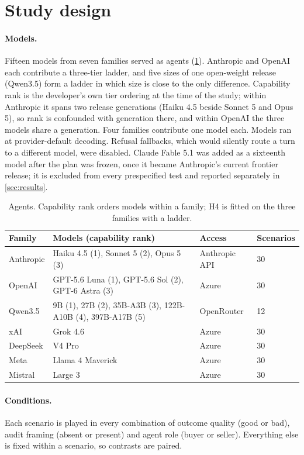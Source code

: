 \section{Study design}
\label{sec:design}

\paragraph{Models.} Fifteen models from seven families served as agents (\cref{tab:models}). Anthropic and OpenAI each contribute a three-tier ladder, and five sizes of one open-weight release (Qwen3.5) form a ladder in which size is close to the only difference. Capability rank is the developer's own tier ordering at the time of the study; within Anthropic it spans two release generations (Haiku 4.5 beside Sonnet 5 and Opus 5), so rank is confounded with generation there, and within OpenAI the three models share a generation. Four families contribute one model each. Models ran at provider-default decoding. Refusal fallbacks, which would silently route a turn to a different model, were disabled. Claude Fable 5.1 was added as a sixteenth model after the plan was frozen, once it became Anthropic's current frontier release; it is excluded from every prespecified test and reported separately in \cref{sec:results}.

\begin{table}[t]
\centering\small
\caption{Agents. Capability rank orders models within a family; H4 is fitted on the three families with a ladder.}
\label{tab:models}
\begin{tabularx}{\linewidth}{llXl}
\toprule
Family & Models (capability rank) & Access & Scenarios \\
\midrule
Anthropic & Haiku 4.5 (1), Sonnet 5 (2), Opus 5 (3) & Anthropic API & 30 \\
OpenAI & GPT-5.6 Luna (1), GPT-5.6 Sol (2), GPT-6 Astra (3) & Azure & 30 \\
Qwen3.5 & 9B (1), 27B (2), 35B-A3B (3), 122B-A10B (4), 397B-A17B (5) & OpenRouter & 12 \\
xAI & Grok 4.6 & Azure & 30 \\
DeepSeek & V4 Pro & Azure & 30 \\
Meta & Llama 4 Maverick & Azure & 30 \\
Mistral & Large 3 & Azure & 30 \\
\bottomrule
\end{tabularx}
\end{table}

\paragraph{Conditions.} Each scenario is played in every combination of outcome quality (good or bad), audit framing (absent or present) and agent role (buyer or seller). Everything else is fixed within a scenario, so contrasts are paired.

